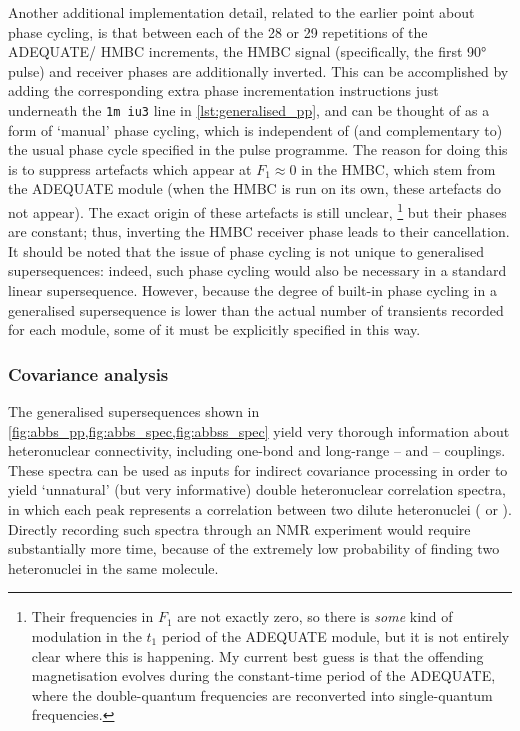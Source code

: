 Another additional implementation detail, related to the earlier point about phase cycling, is that between each of the 28 or 29 repetitions of the ADEQUATE/\nitrogen{} HMBC increments, the \nitrogen{} HMBC signal (specifically, the first \nitrogen{} \ang{90} pulse) and receiver phases are additionally inverted.
This can be accomplished by adding the corresponding extra phase incrementation instructions just underneath the \texttt{1m iu3} line in \cref{lst:generalised_pp}, and can be thought of as a form of `manual' phase cycling, which is independent of (and complementary to) the usual phase cycle specified in the pulse programme.
The reason for doing this is to suppress artefacts which appear at $F_1 \approx 0$ in the \nitrogen{} HMBC, which stem from the ADEQUATE module (when the \nitrogen{} HMBC is run on its own, these artefacts do not appear).
The exact origin of these artefacts is still unclear,%
\footnote{Their frequencies in $F_1$ are not exactly zero, so there is \textit{some} kind of modulation in the $t_1$ period of the ADEQUATE module, but it is not entirely clear where this is happening. My current best guess is that the offending magnetisation evolves during the constant-time period of the ADEQUATE, where the double-quantum frequencies are reconverted into single-quantum frequencies.}
but their phases are constant; thus, inverting the \nitrogen{} HMBC receiver phase leads to their cancellation.
It should be noted that the issue of phase cycling is not unique to generalised supersequences: indeed, such phase cycling would also be necessary in a standard linear  supersequence.
However, because the degree of built-in phase cycling in a generalised supersequence is lower than the actual number of transients recorded for each module, some of it must be explicitly specified in this way.


\subsubsection{Covariance analysis}

The generalised supersequences shown in \cref{fig:abbs_pp,fig:abbs_spec,fig:abbss_spec} yield very thorough information about heteronuclear connectivity, including one-bond and long-range \proton{}--\carbon{} and \proton{}--\nitrogen{} couplings.
These spectra can be used as inputs for indirect covariance processing\autocite{Zhang2004JACS,Snyder2009JPCA,Jaeger2014ARNMRS} in order to yield `unnatural' (but very informative) double heteronuclear correlation spectra, in which each peak represents a correlation between two dilute heteronuclei (\carbon{} or \nitrogen{}).
Directly recording such spectra through an NMR experiment would require substantially more time, because of the extremely low probability of finding two heteronuclei in the same molecule.


